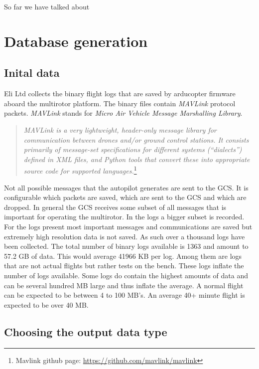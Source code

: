 \documentclass[12pt,oneside]{reedthesis}
\theoremstyle{definition}
\theoremstyle{definition}
\theoremstyle{definition}
\theoremstyle{remark}
\begin{document}
So far we have talked about

\chapter{Database generation}\label{dbs}

\section{Inital data}\label{inital-data}

Eli Ltd collects the binary flight logs that are saved by arducopter
firmware aboard the multirotor platform. The binary files contain
\emph{MAVLink} protocol packets. \emph{MAVLink} stands for \emph{Micro
Air Vehicle Message Marshalling Library}.
\begin{quote}
\emph{MAVLink is a very lightweight, header-only message library for
communication between drones and/or ground control stations. It consists
primarily of message-set specifications for different systems
(``dialects'') defined in XML files, and Python tools that convert these
into appropriate source code for supported languages.}\footnote{Mavlink
  github page: \url{https://github.com/mavlink/mavlink}}
\end{quote}
Not all possible messages that the autopilot generates are sent to the
GCS. It is configurable which packets are saved, which are sent to the
GCS and which are dropped. In general the GCS receives some subset of
all messages that is important for operating the multirotor. In the logs
a bigger subset is recorded. For the logs present most important
messages and communications are saved but extremely high resolution data
is not saved. As such over a thousand logs have been collected. The
total number of binary logs available is 1363 and amount to 57.2 GB of
data. This would average 41966 KB per log. Among them are logs that are
not actual flights but rather tests on the bench. These logs inflate the
number of logs available. Some logs do contain the highest amounts of
data and can be several hundred MB large and thus inflate the average. A
normal flight can be expected to be between 4 to 100 MB's. An average
40+ minute flight is expected to be over 40 MB.

\hypertarget{choosing-the-output-data-type}{\section{Choosing the output
data type}\label{choosing-the-output-data-type}}
\end{document}
